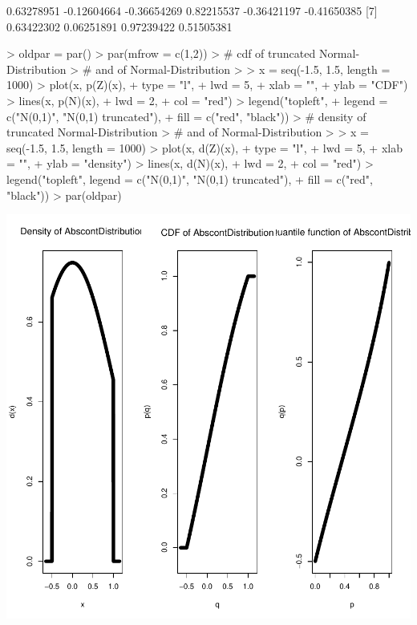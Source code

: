\documentclass[11pt]{article}
\begin{document}
\begin{Schunk}
\begin{Soutput}
 [1]  0.63278951 -0.12604664 -0.36654269  0.82215537 -0.36421197 -0.41650385
 [7]  0.63422302  0.06251891  0.97239422  0.51505381
\end{Soutput}
\begin{Sinput}
> oldpar = par()
> par(mfrow = c(1,2))
> # cdf of truncated Normal-Distribution
> # and of Normal-Distribution
> 
> x = seq(-1.5, 1.5, length = 1000)
> plot(x, p(Z)(x),
+      type = "l",
+      lwd = 5,
+      xlab = "",
+      ylab = "CDF")
> lines(x, p(N)(x),
+       lwd = 2,
+       col = "red")
> legend("topleft",
+        legend = c("N(0,1)", "N(0,1) truncated"),
+        fill = c("red", "black"))
> # density of truncated Normal-Distribution
> # and of Normal-Distribution
> 
> x = seq(-1.5, 1.5, length = 1000)
> plot(x, d(Z)(x),
+      type = "l",
+      lwd = 5,
+      xlab = "",
+      ylab = "density")
> lines(x, d(N)(x),
+       lwd = 2,
+       col = "red")
> legend("topleft", legend = c("N(0,1)", "N(0,1) truncated"),
+        fill = c("red", "black"))
> par(oldpar)
\end{Sinput}
\end{Schunk}
\includegraphics{distr-truncate}
\end{document}
